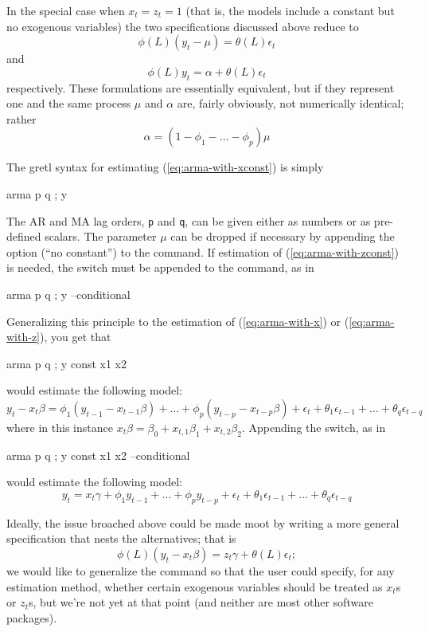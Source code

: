 In the special case when $x_t = z_t = 1$ (that is, the models include
a constant but no exogenous variables) the two specifications discussed
above reduce to
\begin{equation}
  \phi(L) (y_t - \mu) = \theta(L) \epsilon_t
  \label{eq:arma-with-xconst} 
\end{equation}
and
\begin{equation}
  \phi(L) y_t = \alpha + \theta(L) \epsilon_t
  \label{eq:arma-with-zconst}
\end{equation}
respectively.  These formulations are essentially equivalent, but if
they represent one and the same process $\mu$ and $\alpha$ are, fairly
obviously, not numerically identical; rather
\[
\alpha = \left(1 - \phi_1 - \ldots - \phi_p\right) \mu
\]

The gretl syntax for estimating (\ref{eq:arma-with-xconst}) is simply
\begin{code}
arma p q ; y
\end{code}
The AR and MA lag orders, \texttt{p} and \texttt{q}, can be given either as
numbers or as pre-defined scalars. The parameter $\mu$ can be dropped
if necessary by appending the option  (``no constant'') to
the command. If estimation of (\ref{eq:arma-with-zconst}) is needed,
the switch  must be appended to the command, as
in 
\begin{code}
arma p q ; y --conditional
\end{code}

Generalizing this principle to the estimation of
(\ref{eq:arma-with-x}) or (\ref{eq:arma-with-z}), you get that
%
\begin{code}
arma p q ; y const x1 x2
\end{code}
%
would estimate the following model:
\[
  y_t - x_t \beta = \phi_1 \left(y_{t-1} - x_{t-1} \beta \right) + \ldots + 
   \phi_p \left( y_{t-p} - x_{t-p} \beta \right) + 
  \epsilon_t + \theta_1 \epsilon_{t-1} + \ldots + \theta_q \epsilon_{t-q}
\]
where in this instance $x_t \beta = \beta_0 + x_{t,1} \beta_1 +
x_{t,2} \beta_2$. Appending the  switch, as in 
\begin{code}
arma p q ; y const x1 x2 --conditional
\end{code}
would estimate the following model:
\[
  y_t = x_t \gamma + \phi_1 y_{t-1} + \ldots +  \phi_p y_{t-p} + 
  \epsilon_t + \theta_1 \epsilon_{t-1} + \ldots + \theta_q \epsilon_{t-q}
\]

Ideally, the issue broached above could be made moot by writing a more
general specification that nests the alternatives; that is
\begin{equation}
 \label{armax-general}
  \phi(L) \left(y_t - x_t \beta\right) = z_t \gamma  + \theta(L) \epsilon_t ;
\end{equation}
we would like to generalize the  command so that
the user could specify, for any estimation method, whether certain
exogenous variables should be treated as $x_t$s or $z_t$s, but we're
not yet at that point (and neither are most other software packages).


